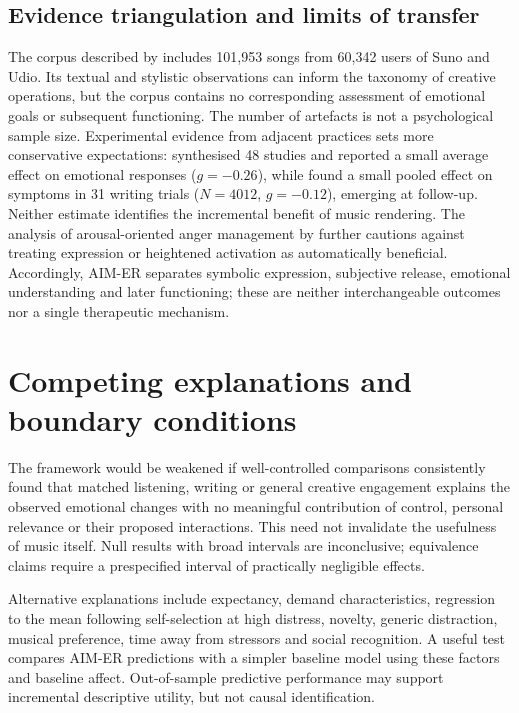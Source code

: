 \documentclass[11pt,a4paper]{article}
\begin{document}
\subsection{Evidence triangulation and limits of transfer}
The corpus described by \citet{casini2026} includes 101,953 songs from 60,342 users of Suno and Udio. Its textual and stylistic observations can inform the taxonomy of creative operations, but the corpus contains no corresponding assessment of emotional goals or subsequent functioning. The number of artefacts is not a psychological sample size. Experimental evidence from adjacent practices sets more conservative expectations: \citet{guodistance2022} synthesised 48 studies and reported a small average effect on emotional responses ($g=-0.26$), while \citet{guowriting2023} found a small pooled effect on symptoms in 31 writing trials ($N=4012$, $g=-0.12$), emerging at follow-up. Neither estimate identifies the incremental benefit of music rendering. The analysis of arousal-oriented anger management by \citet{kjaervik2024} further cautions against treating expression or heightened activation as automatically beneficial. Accordingly, AIM-ER separates symbolic expression, subjective release, emotional understanding and later functioning; these are neither interchangeable outcomes nor a single therapeutic mechanism.

\section{Competing explanations and boundary conditions}
The framework would be weakened if well-controlled comparisons consistently found that matched listening, writing or general creative engagement explains the observed emotional changes with no meaningful contribution of control, personal relevance or their proposed interactions. This need not invalidate the usefulness of music itself. Null results with broad intervals are inconclusive; equivalence claims require a prespecified interval of practically negligible effects.

Alternative explanations include expectancy, demand characteristics, regression to the mean following self-selection at high distress, novelty, generic distraction, musical preference, time away from stressors and social recognition. A useful test compares AIM-ER predictions with a simpler baseline model using these factors and baseline affect. Out-of-sample predictive performance may support incremental descriptive utility, but not causal identification.
\end{document}
